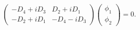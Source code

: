 \begin{equation}\label{swe2-1}
 \begin{pmatrix} -D_4+iD_3 & D_2+iD_1
   \\ -D_2+iD_1 & -D_4-iD_3\end{pmatrix}
 \begin{pmatrix} \phi_1\\ \phi_2\end{pmatrix} =0.
\end{equation}

